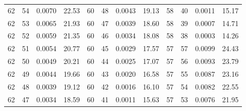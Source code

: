 \begin{tabular}{llll|llll|llll}
62 & 54 & 0.0070 & 22.53 & 60 & 48 & 0.0043 & 19.13 & 58 & 40 & 0.0011 & 15.17\\
62 & 53 & 0.0065 & 21.93 & 60 & 47 & 0.0039 & 18.60 & 58 & 39 & 0.0007 & 14.71\\
62 & 52 & 0.0059 & 21.35 & 60 & 46 & 0.0034 & 18.08 & 58 & 38 & 0.0003 & 14.26\\
62 & 51 & 0.0054 & 20.77 & 60 & 45 & 0.0029 & 17.57 & 57 & 57 & 0.0099 & 24.43\\
62 & 50 & 0.0049 & 20.21 & 60 & 44 & 0.0025 & 17.07 & 57 & 56 & 0.0093 & 23.79\\
62 & 49 & 0.0044 & 19.66 & 60 & 43 & 0.0020 & 16.58 & 57 & 55 & 0.0087 & 23.16\\
62 & 48 & 0.0039 & 19.12 & 60 & 42 & 0.0016 & 16.10 & 57 & 54 & 0.0082 & 22.55\\
62 & 47 & 0.0034 & 18.59 & 60 & 41 & 0.0011 & 15.63 & 57 & 53 & 0.0076 & 21.95\\
\bottomrule
\end{tabular}
\newpage
